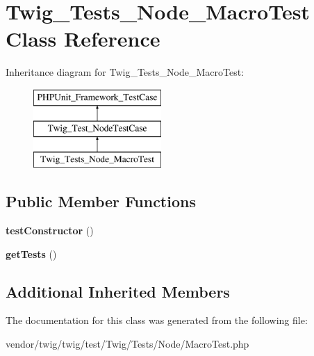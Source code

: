 \hypertarget{classTwig__Tests__Node__MacroTest}{}\section{Twig\+\_\+\+Tests\+\_\+\+Node\+\_\+\+Macro\+Test Class Reference}
\label{classTwig__Tests__Node__MacroTest}
Inheritance diagram for Twig\+\_\+\+Tests\+\_\+\+Node\+\_\+\+Macro\+Test\+:\begin{figure}[H]
\begin{center}
\leavevmode
\includegraphics[height=3.000000cm]{classTwig__Tests__Node__MacroTest}
\end{center}
\end{figure}
\subsection*{Public Member Functions}
\begin{DoxyCompactItemize}
\item 
{\bfseries test\+Constructor} ()\hypertarget{classTwig__Tests__Node__MacroTest_ad84a5029528f85dc1afe063b0d5e90c1}{}\label{classTwig__Tests__Node__MacroTest_ad84a5029528f85dc1afe063b0d5e90c1}

\item 
{\bfseries get\+Tests} ()\hypertarget{classTwig__Tests__Node__MacroTest_ad8094b2e0a521f751ed51a6738a15ff3}{}\label{classTwig__Tests__Node__MacroTest_ad8094b2e0a521f751ed51a6738a15ff3}

\end{DoxyCompactItemize}
\subsection*{Additional Inherited Members}


The documentation for this class was generated from the following file\+:\begin{DoxyCompactItemize}
\item 
vendor/twig/twig/test/\+Twig/\+Tests/\+Node/Macro\+Test.\+php\end{DoxyCompactItemize}
